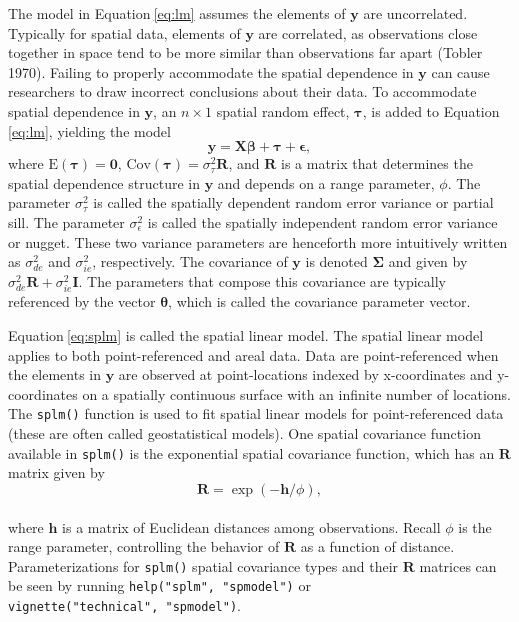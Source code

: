 \documentclass{article}
\begin{document}
The model in Equation\(~\)\ref{eq:lm} assumes the elements of
\(\mathbf{y}\) are uncorrelated. Typically for spatial data, elements of
\(\mathbf{y}\) are correlated, as observations close together in space
tend to be more similar than observations far apart (Tobler 1970).
Failing to properly accommodate the spatial dependence in \(\mathbf{y}\)
can cause researchers to draw incorrect conclusions about their data. To
accommodate spatial dependence in \(\mathbf{y}\), an \(n \times 1\)
spatial random effect, \(\boldsymbol{\tau}\), is added to
Equation\(~\)\ref{eq:lm}, yielding the model
\begin{equation}\label{eq:splm}
 \mathbf{y} = \mathbf{X} \boldsymbol{\beta} + \boldsymbol{\tau} + \boldsymbol{\epsilon},
\end{equation} where \(\text{E}(\boldsymbol{\tau}) = \mathbf{0}\),
\(\text{Cov}(\boldsymbol{\tau}) = \sigma^2_\tau \mathbf{R}\), and
\(\mathbf{R}\) is a matrix that determines the spatial dependence
structure in \(\mathbf{y}\) and depends on a range parameter, \(\phi\).
The parameter \(\sigma^2_\tau\) is called the spatially dependent random
error variance or partial sill. The parameter \(\sigma^2_\epsilon\) is
called the spatially independent random error variance or nugget. These
two variance parameters are henceforth more intuitively written as
\(\sigma^2_{de}\) and \(\sigma^2_{ie}\), respectively. The covariance of
\(\mathbf{y}\) is denoted \(\boldsymbol{\Sigma}\) and given by
\(\sigma^2_{de} \mathbf{R} + \sigma^2_{ie} \mathbf{I}\). The parameters
that compose this covariance are typically referenced by the vector
\(\boldsymbol{\theta}\), which is called the covariance parameter
vector.

Equation\(~\)\ref{eq:splm} is called the spatial linear model. The
spatial linear model applies to both point-referenced and areal data.
Data are point-referenced when the elements in \(\mathbf{y}\) are
observed at point-locations indexed by x-coordinates and y-coordinates
on a spatially continuous surface with an infinite number of locations.
The \texttt{splm()} function is used to fit spatial linear models for
point-referenced data (these are often called geostatistical models).
One spatial covariance function available in \texttt{splm()} is the
exponential spatial covariance function, which has an \(\mathbf{R}\)
matrix given by \begin{equation*}
  \mathbf{R} = \exp(-\mathbf{h} / \phi),
\end{equation*}\\
where \(\mathbf{h}\) is a matrix of Euclidean distances among
observations. Recall \(\phi\) is the range parameter, controlling the
behavior of \(\mathbf{R}\) as a function of distance. Parameterizations
for \texttt{splm()} spatial covariance types and their \(\mathbf{R}\)
matrices can be seen by running \texttt{help("splm",\ "spmodel")} or
\texttt{vignette("technical",\ "spmodel")}.
\end{document}
